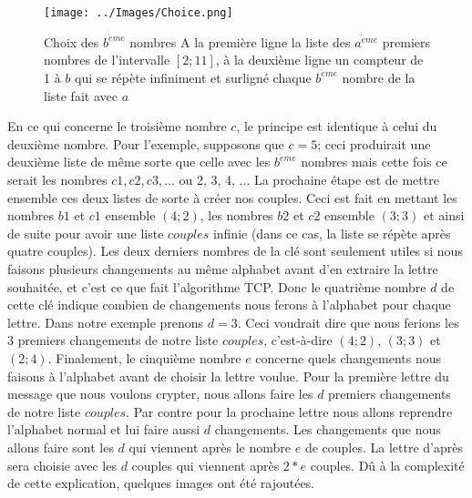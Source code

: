 \documentclass[a4paper,12pt]{report}
\begin{document}
     \begin{figure}[h!]
     \begin{center}
     \texttt{[image: ../Images/Choice.png]}  
     \end{center}
     \caption{Choix des $b^{\grave{e}me}$ nombres \newline
     A la première ligne la liste des $a^{\grave{e}me}$ premiers nombres de l'intervalle $[2;11]$, à la deuxième ligne un compteur de 1 à $b$ qui se répète infiniment et surligné chaque $b^{\grave{e}me}$ nombre de la liste fait avec $a$}
     \end{figure} \newline
     En ce qui concerne le troisième nombre $c$, le principe est identique à celui du deuxième nombre. Pour l'exemple, supposons que $c = 5$; ceci produirait une deuxième liste de même sorte que celle avec les $b^{\grave{e}me}$ nombres mais cette fois ce serait les nombres $c1, c2, c3, ...$ ou 2, 3, 4, ... \newline
     La prochaine étape est de mettre ensemble ces deux listes de sorte à créer nos couples. Ceci est fait en mettant les nombres $b1$ et $c1$ ensemble $(4;2)$, les nombres $b2$ et $c2$ ensemble $(3;3)$ et ainsi de suite pour avoir une liste $couples$ infinie (dans ce cas, la liste se répète après quatre couples). \newline
     Les deux derniers nombres de la clé sont seulement utiles si nous faisons plusieurs changements au même alphabet avant d'en extraire la lettre souhai\-tée, et c'est ce que fait l'algorithme TCP. Donc le quatrième nombre $d$ de cette clé indique combien de changements nous ferons à l'alphabet pour chaque lettre. Dans notre exemple prenons $d = 3$. Ceci voudrait dire que nous ferions les 3 premiers changements de notre liste $couples$, c'est-à-dire $(4;2)$, $(3;3)$ et $(2;4)$. 
     \pagebreak
     \newline
Finalement, le cinquième nombre $e$ concerne quels changements nous faisons à l'alphabet avant de choisir la lettre voulue. Pour la première lettre du message que nous voulons crypter, nous allons faire les $d$ premiers changements de notre liste $couples$. Par contre pour la prochaine lettre nous allons reprendre l'alphabet normal et lui faire aussi $d$ changements. Les changements que nous allons faire sont les $d$ qui viennent après le nombre $e$ de couples. La lettre d'après sera choisie avec les $d$ couples qui viennent après $2*e$ couples. Dû à la complexité de cette explication, quelques images ont été rajoutées.
\end{document}
